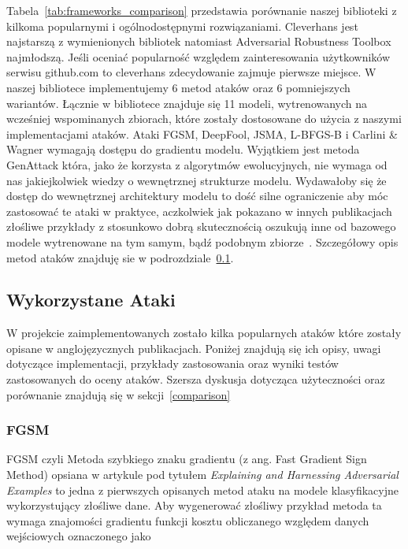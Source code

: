 \documentclass[
    left=2.5cm,         %
    right=2.5cm,        %
    top=2.5cm,          %
    bottom=3cm,         %
    bindingoffset=6mm,  %
    nohyphenation=false %
]{eiti/eiti-thesis}
\begin{document}
Tabela~\ref{tab:frameworks_comparison} przedstawia porównanie naszej biblioteki z kilkoma popularnymi i ogólnodostępnymi rozwiązaniami.
Cleverhans jest najstarszą z wymienionych bibliotek natomiast Adversarial Robustness Toolbox najmłodszą.
Jeśli oceniać popularność względem zainteresowania użytkowników serwisu github.com to cleverhans zdecydowanie zajmuje pierwsze miejsce.
W naszej bibliotece implementujemy 6 metod ataków oraz 6 pomniejszych wariantów. Łącznie w bibliotece znajduje się
11 modeli, wytrenowanych na wcześniej wspominanych zbiorach, które zostały dostosowane do użycia z naszymi implementacjami ataków.
Ataki FGSM, DeepFool, JSMA, L-BFGS-B i Carlini \& Wagner wymagają dostępu do gradientu modelu.
Wyjątkiem jest metoda GenAttack która, jako że korzysta z algorytmów ewolucyjnych, nie wymaga od nas jakiejkolwiek wiedzy o wewnętrznej strukturze modelu.
Wydawałoby się że dostęp do wewnętrznej architektury modelu to dość silne ograniczenie aby móc zastosować te ataki w praktyce, aczkolwiek jak pokazano w innych publikacjach złośliwe przykłady z stosunkowo dobrą
skutecznością oszukują inne od bazowego modele wytrenowane na tym samym, bądź podobnym zbiorze~\cite{DBLP:journals/corr/PapernotMG16}.
Szczegółowy opis metod ataków znajduję sie w podrozdziale~\ref{sec:used_attacks}.


\subsection{Wykorzystane Ataki}\label{sec:used_attacks}
W projekcie zaimplementowanych zostało kilka popularnych ataków które zostały opisane w anglojęzycznych publikacjach.
Poniżej znajdują się ich opisy, uwagi dotyczące implementacji, przykłady zastosowania oraz wyniki testów
zastosowanych do oceny ataków. Szersza dyskusja dotycząca użyteczności oraz porównanie znajdują się w sekcji~\ref{comparison}

\subsubsection{FGSM}
    FGSM czyli Metoda szybkiego znaku gradientu (z ang. Fast Gradient Sign Method) opsiana w artykule
    pod tytułem \textit{Explaining and Harnessing Adversarial Examples}\cite{harnessing} to jedna z pierwszych
    opisanych metod ataku na modele klasyfikacyjne wykorzystujący złośliwe dane.
    Aby wygenerować złośliwy przykład metoda ta wymaga znajomości gradientu funkcji kosztu obliczanego względem danych
    wejściowych oznaczonego jako
\end{document}
